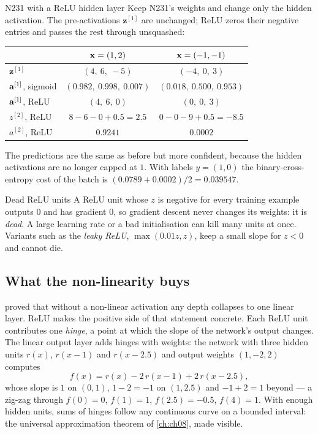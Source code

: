 \begin{workedexample}{N231 with a ReLU hidden layer}
Keep N231's weights and change only the hidden activation. The pre-activations
$\mathbf{z}^{[1]}$ are unchanged; ReLU zeros their negative entries and passes
the rest through unsquashed:

\begin{center}
\small
\renewcommand{\arraystretch}{1.2}
\begin{tabular}{@{}lcc@{}}
\toprule
 & $\mathbf{x} = (1,2)$ & $\mathbf{x} = (-1,-1)$\\
\midrule
$\mathbf{z}^{[1]}$             & $(4,\ 6,\ -5)$ & $(-4,\ 0,\ 3)$\\
$\mathbf{a}^{[1]}$, sigmoid           & $(0.982,\ 0.998,\ 0.007)$ & $(0.018,\ 0.500,\ 0.953)$\\
$\mathbf{a}^{[1]}$, ReLU              & $(4,\ 6,\ 0)$ & $(0,\ 0,\ 3)$\\
$z^{[2]}$, ReLU                & $8 - 6 - 0 + 0.5 = 2.5$ & $0 - 0 - 9 + 0.5 = -8.5$\\
$a^{[2]}$, ReLU                & $\mathbf{0.9241}$ & $\mathbf{0.0002}$\\
\bottomrule
\end{tabular}
\end{center}

The predictions are the same as before but more confident, because the hidden
activations are no longer capped at $1$. With labels $y = (1, 0)$ the
binary-cross-entropy cost of the batch is $(0.0789 + 0.0002)/2 = 0.039547$.
\end{workedexample}

\begin{pitfall}{Dead ReLU units}
A ReLU unit whose $z$ is negative for every training example outputs $0$ and
has gradient $0$, so gradient descent never changes its weights: it is
\emph{dead}. A large learning rate or a bad initialisation can kill many units at
once. Variants such as the \emph{leaky ReLU}, $\max(0.01z, z)$, keep a small
slope for $z < 0$ and cannot die.
\end{pitfall}

\subsection{What the non-linearity buys}

 proved that without a non-linear activation any depth
collapses to one linear layer. ReLU makes the positive side of that statement
concrete. Each ReLU unit contributes one \emph{hinge}, a point at which the
slope of the network's output changes. The linear output layer adds hinges with
weights: the network with three hidden units $r(x)$, $r(x-1)$ and $r(x-2.5)$
and output weights $(1, -2, 2)$ computes
\[
  f(x) = r(x) - 2\,r(x-1) + 2\,r(x-2.5),
\]
whose slope is $1$ on $(0,1)$, $1 - 2 = -1$ on $(1, 2.5)$ and $-1 + 2 = 1$ beyond
--- a zig-zag through $f(0) = 0$, $f(1) = 1$, $f(2.5) = -0.5$, $f(4) = 1$. With
enough hidden units, sums of hinges follow any continuous curve on a bounded
interval: the universal approximation theorem of \cref{ch:ch08}, made visible.

